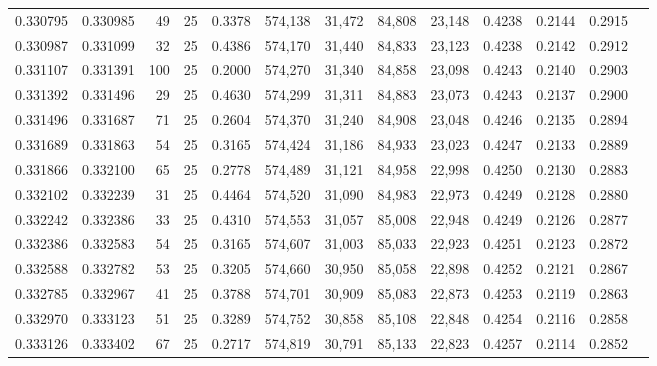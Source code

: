 \begin{tabular}{rrrrrrrrrrrrr}
0.330795 & 0.330985 &    49 &  25 &                                     0.3378 & 574,138 &  31,472 &  84,808 &  23,148 & 0.4238 & 0.2144 & 0.2915 \\
0.330987 & 0.331099 &    32 &  25 &                                     0.4386 & 574,170 &  31,440 &  84,833 &  23,123 & 0.4238 & 0.2142 & 0.2912 \\
0.331107 & 0.331391 &   100 &  25 &                                     0.2000 & 574,270 &  31,340 &  84,858 &  23,098 & 0.4243 & 0.2140 & 0.2903 \\
0.331392 & 0.331496 &    29 &  25 &                                     0.4630 & 574,299 &  31,311 &  84,883 &  23,073 & 0.4243 & 0.2137 & 0.2900 \\
0.331496 & 0.331687 &    71 &  25 &                                     0.2604 & 574,370 &  31,240 &  84,908 &  23,048 & 0.4246 & 0.2135 & 0.2894 \\
0.331689 & 0.331863 &    54 &  25 &                                     0.3165 & 574,424 &  31,186 &  84,933 &  23,023 & 0.4247 & 0.2133 & 0.2889 \\
0.331866 & 0.332100 &    65 &  25 &                                     0.2778 & 574,489 &  31,121 &  84,958 &  22,998 & 0.4250 & 0.2130 & 0.2883 \\
0.332102 & 0.332239 &    31 &  25 &                                     0.4464 & 574,520 &  31,090 &  84,983 &  22,973 & 0.4249 & 0.2128 & 0.2880 \\
0.332242 & 0.332386 &    33 &  25 &                                     0.4310 & 574,553 &  31,057 &  85,008 &  22,948 & 0.4249 & 0.2126 & 0.2877 \\
0.332386 & 0.332583 &    54 &  25 &                                     0.3165 & 574,607 &  31,003 &  85,033 &  22,923 & 0.4251 & 0.2123 & 0.2872 \\
0.332588 & 0.332782 &    53 &  25 &                                     0.3205 & 574,660 &  30,950 &  85,058 &  22,898 & 0.4252 & 0.2121 & 0.2867 \\
0.332785 & 0.332967 &    41 &  25 &                                     0.3788 & 574,701 &  30,909 &  85,083 &  22,873 & 0.4253 & 0.2119 & 0.2863 \\
0.332970 & 0.333123 &    51 &  25 &                                     0.3289 & 574,752 &  30,858 &  85,108 &  22,848 & 0.4254 & 0.2116 & 0.2858 \\
0.333126 & 0.333402 &    67 &  25 &                                     0.2717 & 574,819 &  30,791 &  85,133 &  22,823 & 0.4257 & 0.2114 & 0.2852 \\

\end{tabular}

